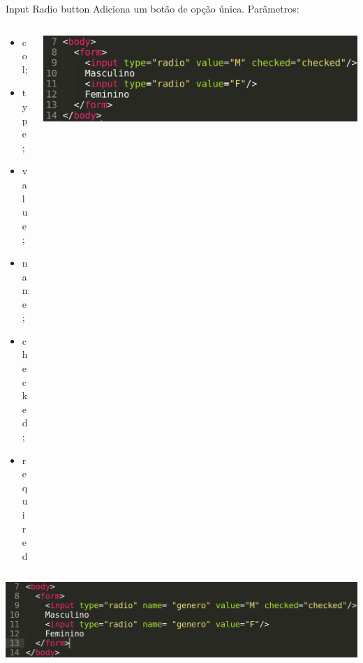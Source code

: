 \documentclass{beamer}
\begin{document}
\begin{frame}{Input Radio button}
  Adiciona um botão de opção única. Parâmetros:
    \begin{columns}
    \begin{column}{0.3 \textwidth}
      \small
     \begin{itemize}
       \item col;
        \item type;
        \item value;
        \item name;
        \item checked;
        \item required
     \end{itemize}
    \end{column}
    
    \begin{column}{0.6\textwidth}
     \includegraphics[height=0.2\paperheight]{fig/aula4/aula4_9.png}
    \end{column}
  \end{columns}
  
  \includegraphics[height=0.2\paperheight]{fig/aula4/aula4_10.png}
\end{frame}
\end{document}
